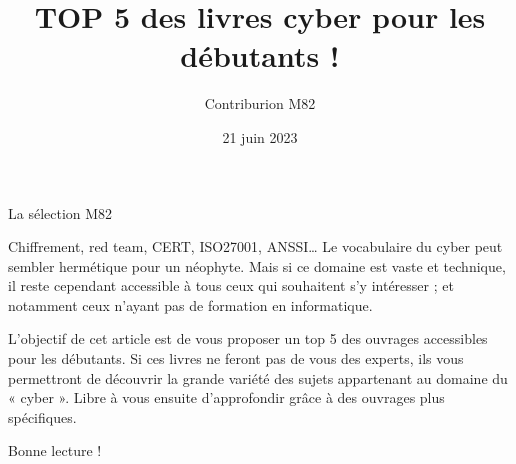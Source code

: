 \documentclass[a4paper]{article}
\title{TOP 5 des livres cyber pour les débutants !}
\author{Contriburion M82} %
\date{21 juin 2023}
\begin{document}
\maketitle                 

La sélection M82

Chiffrement, red team, CERT, ISO27001, ANSSI… Le vocabulaire du cyber peut sembler hermétique pour un néophyte. Mais si ce domaine est vaste et technique, il reste cependant accessible à tous ceux qui souhaitent s’y intéresser ; et notamment ceux n’ayant pas de formation en informatique. 

L’objectif de cet article est de vous proposer un top 5 des ouvrages accessibles pour les débutants. Si ces livres ne feront pas de vous des experts, ils vous permettront de découvrir la grande variété des sujets appartenant au domaine du « cyber ». Libre à vous ensuite d’approfondir grâce à des ouvrages plus spécifiques.

Bonne lecture !
\end{document}
